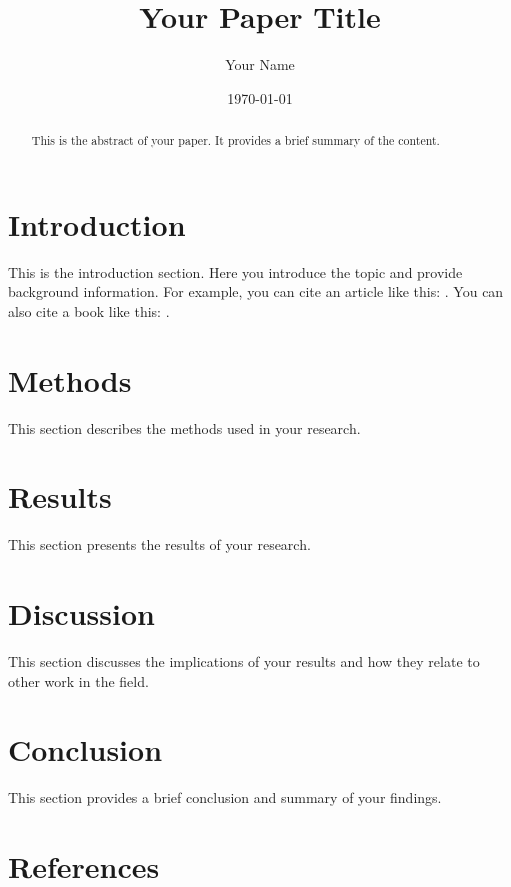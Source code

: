 \documentclass[12pt]{article}
\title{Your Paper Title}
\author{Your Name}
\date{\today}
\begin{document}
\maketitle

\begin{abstract}
This is the abstract of your paper. It provides a brief summary of the content.
\end{abstract}

\section{Introduction}
This is the introduction section. Here you introduce the topic and provide background information. For example, you can cite an article like this: \cite{example2023}. You can also cite a book like this: \cite{examplebook2023}.

\section{Methods}
This section describes the methods used in your research.

\section{Results}
This section presents the results of your research.

\section{Discussion}
This section discusses the implications of your results and how they relate to other work in the field.

\section{Conclusion}
This section provides a brief conclusion and summary of your findings.

\section*{References}


\end{document}
